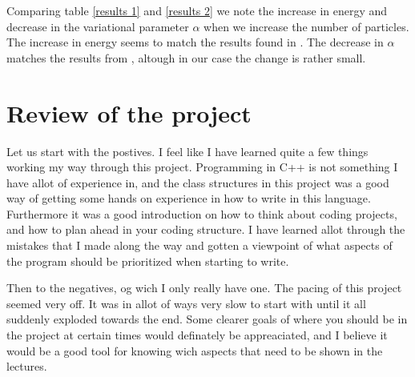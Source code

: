 \documentclass[a4paper, 10pt, english]{revtex4-2} %
\begin{document}
    Comparing table \ref{results 1} and \ref{results 2} we note the increase in energy and decrease in the variational parameter $\alpha$ when we increase the number of particles.
    The increase in energy seems to match the results found in \cite{dubois2001bose}.
    The decrease in $\alpha$ matches the results from \cite{nilsen2005vortices}, altough in our case the change is rather small.


\section{Review of the project}
    Let us start with the postives.
    I feel like I have learned quite a few things working my way through this project.
    Programming in C++ is not something I have allot of experience in, and the class structures in this project was a good way of getting some hands on experience in how to write in this language.
    Furthermore it was a good introduction on how to think about coding projects, and how to plan ahead in your coding structure.
    I have learned allot through the mistakes that I made along the way and gotten a viewpoint of what aspects of the program should be prioritized when starting to write.

    Then to the negatives, og wich I only really have one.
    The pacing of this project seemed very off.
    It was in allot of ways very slow to start with until it all suddenly exploded towards the end.
    Some clearer goals of where you should be in the project at certain times would definately be appreaciated, and I believe it would be a good tool for knowing wich aspects that need to be shown in the lectures.



\end{document}
